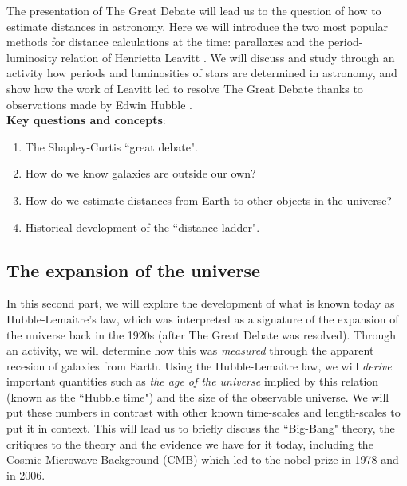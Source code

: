 \documentclass{tufte-handout}
\begin{document}
\begin{fullwidth}
The presentation of The Great Debate will lead us to the question of how to estimate distances in astronomy. Here we will introduce the two 
most popular methods for distance calculations at the time: parallaxes and the period-luminosity relation of Henrietta Leavitt 
\citep{leavitt:1912}. We will discuss and study through an activity how periods and luminosities of stars are determined in astronomy, 
and show how the work of Leavitt led to resolve The Great Debate thanks to observations made by Edwin Hubble \citep{hubble:PL}.\\
\vspace{0.5 cm}
\noindent \textbf{Key questions and concepts}:
\begin{enumerate}
\item The Shapley-Curtis ``great debate".
\item How do we know galaxies are outside our own?
\item How do we estimate distances from Earth to other objects in the universe?  
\item Historical development of the ``distance ladder".
\end{enumerate}

\subsection{The expansion of the universe}
In this second part, we will explore the development of what is known today as Hubble-Lemaitre's law, which was interpreted as a signature 
of the expansion of the universe back in the 1920s (after The Great Debate was resolved). Through an activity, we will determine how this was 
\textit{measured} through the apparent recesion of galaxies from Earth. Using the Hubble-Lemaitre law, we will \textit{derive} important 
quantities such as \textit{the age of the universe} implied by this relation (known as the ``Hubble time") and the size of the observable 
universe. We will put these numbers in contrast with other known time-scales and length-scales to put it in context. This will lead us to 
briefly discuss the ``Big-Bang" theory, the critiques to the theory and the evidence we have for it today, including the Cosmic Microwave 
Background (CMB) which led to the nobel prize in 1978 and in 2006.


\end{fullwidth}
\end{document}
